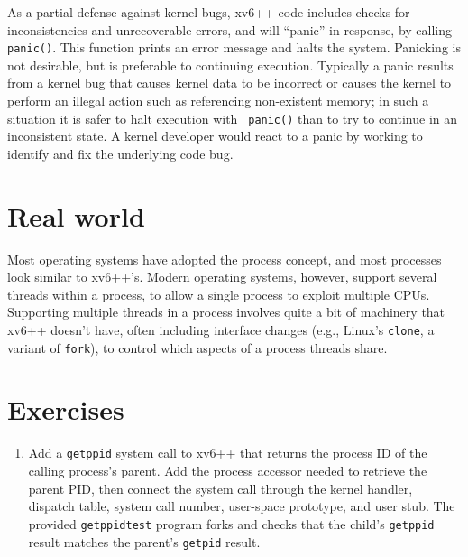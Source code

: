 As a partial defense against kernel bugs, xv6++ code includes checks for
inconsistencies and unrecoverable errors, and will ``panic'' in
response, by calling {\tt panic()}. This function prints an error
message and halts the system. Panicking is not desirable, but is
preferable to continuing execution. Typically a panic results from a
kernel bug that causes kernel data to be incorrect or causes the
kernel to perform an illegal action such as referencing non-existent
memory; in such a situation it is safer to halt execution with {\tt
  panic()} than to try to continue in an inconsistent state. A kernel
developer would react to a panic by working to identify and fix the
underlying code bug.

\section{Real world}

Most operating systems have adopted the process concept, and most
processes look similar to xv6++'s.  Modern operating systems, however,
support several threads within a process, to allow a single process to
exploit multiple CPUs.  Supporting multiple threads in a
process involves quite a bit of machinery that xv6++ doesn't have,
often including interface changes (e.g., Linux's
\lstinline{clone},
a variant of
\lstinline{fork}),
to control which aspects of
a process threads share.
\section{Exercises}

\begin{enumerate}

\item Add a \texttt{getppid} system call to xv6++ that returns the
process ID of the calling process's parent. Add the process accessor
needed to retrieve the parent PID, then connect the system call through
the kernel handler, dispatch table, system call number, user-space
prototype, and user stub. The provided \texttt{getppidtest} program
forks and checks that the child's \texttt{getppid} result matches the
parent's \texttt{getpid} result.


\end{enumerate}
